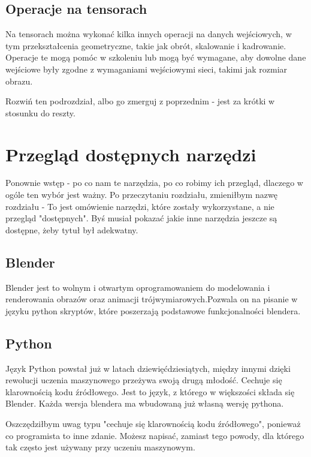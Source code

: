 \documentclass[brudnopis]{xmgr}
\begin{document}
 \section{Operacje na tensorach\label{s:dsssl}}
Na tensorach można  wykonać kilka innych operacji na danych wejściowych, w tym przekształcenia geometryczne, takie jak obrót, skalowanie i kadrowanie. Operacje te mogą pomóc w szkoleniu lub mogą być wymagane, aby dowolne dane wejściowe były zgodne z wymaganiami wejściowymi sieci, takimi jak rozmiar obrazu.

Rozwiń ten podrozdział, albo go zmerguj z poprzednim - jest za krótki w stosunku do reszty.


\chapter{Przegląd dostępnych narzędzi}

Ponownie wstęp - po co nam te narzędzia, po co robimy ich przegląd, dlaczego w ogóle ten wybór jest ważny. Po przeczytaniu rozdziału, zmieniłbym nazwę rozdziału - To jest omówienie narzędzi, które zostały wykorzystane, a nie przegląd "dostępnych". Byś musiał pokazać jakie inne narzędzia jeszcze są dostępne, żeby tytuł był adekwatny.

\section{Blender\label{s:dsssl}}

Blender jest to wolnym i otwartym oprogramowaniem do modelowania i renderowania obrazów oraz animacji trójwymiarowych.Pozwala on na pisanie w języku python skryptów, które poszerzają podstawowe funkcjonalności blendera.

\section{Python\label{s:dsssl}}

Język Python powstał już w latach dziewięćdziesiątych, między innymi dzięki rewolucji uczenia maszynowego przeżywa swoją drugą młodość. Cechuje się klarownością kodu źródłowego.
Jest to język, z którego w większości składa się Blender. Każda wersja blendera ma wbudowaną już własną wersję pythona. 

Oszczędziłbym uwag typu "cechuje się klarownością kodu źródłowego", ponieważ co programista to inne zdanie. Możesz napisać, zamiast tego powody, dla którego tak często jest używany przy uczeniu maszynowym.
\end{document}
